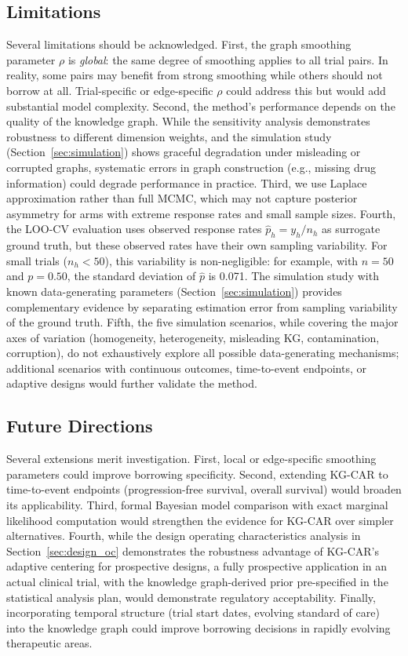 \documentclass[12pt]{article}
\begin{document}
\subsection{Limitations}
\label{sec:limitations}

Several limitations should be acknowledged. First, the graph smoothing parameter $\rho$ is \emph{global}: the same degree of smoothing applies to all trial pairs. In reality, some pairs may benefit from strong smoothing while others should not borrow at all. Trial-specific or edge-specific $\rho$ could address this but would add substantial model complexity. Second, the method's performance depends on the quality of the knowledge graph. While the sensitivity analysis demonstrates robustness to different dimension weights, and the simulation study (Section~\ref{sec:simulation}) shows graceful degradation under misleading or corrupted graphs, systematic errors in graph construction (e.g., missing drug information) could degrade performance in practice. Third, we use Laplace approximation rather than full MCMC, which may not capture posterior asymmetry for arms with extreme response rates and small sample sizes. Fourth, the LOO-CV evaluation uses observed response rates $\hat{p}_h = y_h / n_h$ as surrogate ground truth, but these observed rates have their own sampling variability. For small trials ($n_h < 50$), this variability is non-negligible: for example, with $n = 50$ and $p = 0.50$, the standard deviation of $\hat{p}$ is 0.071. The simulation study with known data-generating parameters (Section~\ref{sec:simulation}) provides complementary evidence by separating estimation error from sampling variability of the ground truth. Fifth, the five simulation scenarios, while covering the major axes of variation (homogeneity, heterogeneity, misleading KG, contamination, corruption), do not exhaustively explore all possible data-generating mechanisms; additional scenarios with continuous outcomes, time-to-event endpoints, or adaptive designs would further validate the method.

\subsection{Future Directions}
\label{sec:future}

Several extensions merit investigation. First, local or edge-specific smoothing parameters could improve borrowing specificity. Second, extending KG-CAR to time-to-event endpoints (progression-free survival, overall survival) would broaden its applicability. Third, formal Bayesian model comparison with exact marginal likelihood computation would strengthen the evidence for KG-CAR over simpler alternatives. Fourth, while the design operating characteristics analysis in Section~\ref{sec:design_oc} demonstrates the robustness advantage of KG-CAR's adaptive centering for prospective designs, a fully prospective application in an actual clinical trial, with the knowledge graph-derived prior pre-specified in the statistical analysis plan, would demonstrate regulatory acceptability. Finally, incorporating temporal structure (trial start dates, evolving standard of care) into the knowledge graph could improve borrowing decisions in rapidly evolving therapeutic areas.
\end{document}
